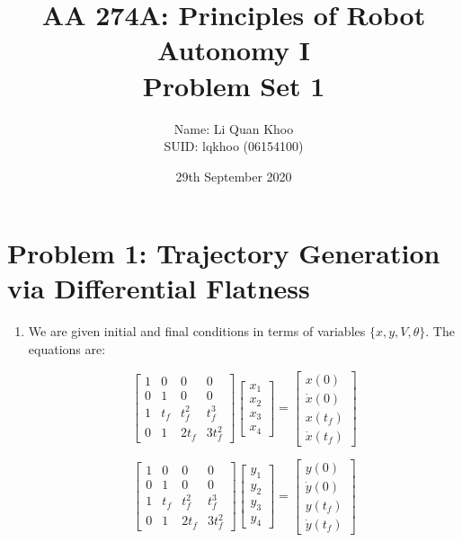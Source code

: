 \documentclass{article}
\title{AA 274A: Principles of Robot Autonomy I \\ Problem Set 1}
\author{Name: Li Quan Khoo     \\ SUID: lqkhoo (06154100)}
\date{29th September 2020}
\begin{document}
\maketitle
\pagestyle{fancy} 

\section*{Problem 1: Trajectory Generation via Differential Flatness}
\begin{enumerate}[label=(\roman*)]
\item %

We are given initial and final conditions in terms of variables $\{x, y, V, \theta\}$. The equations are:

$$
\begin{bmatrix}
1 & 0   & 0      & 0 \\
0 & 1   & 0      & 0 \\
1 & t_f & t_f^2  & t_f^3 \\
0 & 1   & 2 t_f  & 3 t_f^2
\end{bmatrix}
\begin{bmatrix}
x_1 \\ x_2 \\ x_3 \\ x_4
\end{bmatrix}
=
\begin{bmatrix}
x(0) \\ \dot{x}(0) \\ x(t_f) \\ \dot{x}(t_f)
\end{bmatrix}
$$

$$
\begin{bmatrix}
1 & 0   & 0      & 0 \\
0 & 1   & 0      & 0 \\
1 & t_f & t_f^2  & t_f^3 \\
0 & 1   & 2 t_f  & 3 t_f^2
\end{bmatrix}
\begin{bmatrix}
y_1 \\ y_2 \\ y_3 \\ y_4
\end{bmatrix}
=
\begin{bmatrix}
y(0) \\ \dot{y}(0) \\ y(t_f) \\ \dot{y}(t_f)
\end{bmatrix}
$$


\end{enumerate}
\end{document}
